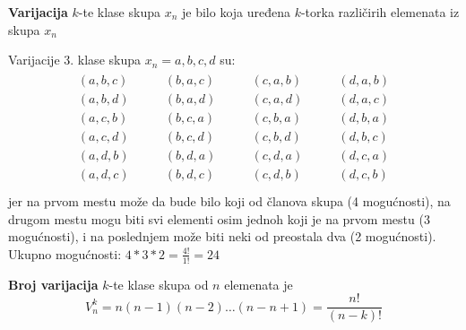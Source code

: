 \begin{definition}
	\textbf{Varijacija} $k$-te klase skupa $x_n$ je bilo koja uređena $k$-torka različirih elemenata iz skupa $x_n$
\end{definition}
\begin{example}
	Varijacije 3. klase skupa $x_n = {a,b,c,d}$ su:
	\begin{align*}
		\begin{aligned}
		(a,b,c)\\
		(a,b,d)\\
		(a,c,b)\\
		(a,c,d)\\
		(a,d,b)\\
		(a,d,c)\\
		\end{aligned}
		\quad \quad
		\begin{aligned}
		(b,a,c)\\
		(b,a,d)\\
		(b,c,a)\\
		(b,c,d)\\
		(b,d,a)\\
		(b,d,c)\\
		\end{aligned}
		\quad \quad
		\begin{aligned}
		(c,a,b)\\
		(c,a,d)\\
		(c,b,a)\\
		(c,b,d)\\
		(c,d,a)\\
		(c,d,b)\\
		\end{aligned}
		\quad \quad
		\begin{aligned}
		(d,a,b)\\
		(d,a,c)\\
		(d,b,a)\\
		(d,b,c)\\
		(d,c,a)\\
		(d,c,b)\\
		\end{aligned}
	\end{align*}
	jer na prvom mestu može da bude bilo koji od članova skupa (4 mogućnosti), na drugom mestu mogu biti svi elementi osim jednoh koji je na prvom mestu (3 mogućnosti), i na poslednjem može biti neki od preostala dva (2 mogućnosti).\\
	Ukupno mogućnosti: $4*3*2=\frac{4!}{1!}=24$
\end{example}
\begin{theorem}
	\textbf{Broj varijacija} $k$-te klase skupa od $n$ elemenata je $$V_n^k = n(n-1)(n-2)\ldots(n-n+1) = \frac{n!}{(n-k)!}$$
\end{theorem}

